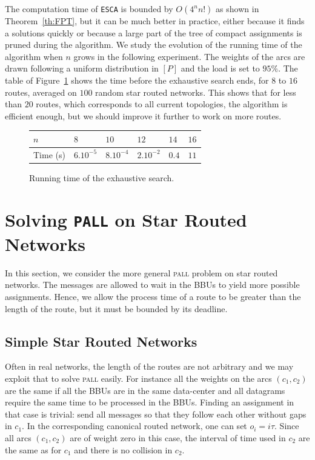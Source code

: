 \documentclass[a4paper,10pt]{article}
\newcommand\ESCA{\texttt{ESCA}\xspace}
\newcommand\pall{\textsc{pall}\xspace}
\begin{document}
       The computation time of \ESCA is bounded by $O(4^nn!)$ as shown in Theorem~\ref{th:FPT}, but it can be much better in practice, either because it finds a solutions quickly or because a large part of the tree of compact assignments is pruned during the algorithm. We study the evolution of the running time  of the algorithm when $n$ grows in the following experiment. The weights of the arcs are drawn following a uniform distribution in $[P]$ and the load is set to $95\%$.  The table of Figure~\ref{fig:table} shows the time before the exhaustive search ends, for $8$ to $16$ routes, averaged on $100$ random star routed networks. This shows that for less than $20$ routes, which corresponds to all current topologies, the algorithm is efficient enough, but we should improve it further to work on more routes.
       
             \begin{figure}[h]
         \begin{center}
         \begin{tabularx}{0.9\textwidth}{|l|X|X|X|X|X|}
    \hline
   $n$ & $8$ & $10$& $12$&$14$& $16$\\
    \hline
   Time (s) & $6.10^{-5}$&$8.10^{-4}$&$2.10^{-2}$& $0.4$& $11$\\
    \hline
      \end{tabularx}
      \end{center}
      \caption{Running time of the exhaustive search.}
      \label{fig:table}
      \end{figure}
      
         \section{Solving \texttt{PALL} on Star Routed Networks}\label{sec:PALL}
    
    In this section, we consider the more general \pall problem on star routed networks. The messages are allowed to wait in the BBUs to yield more possible assignments. Hence, we allow the process time of a route to be greater than the length of the route, but it must be bounded by its deadline.


	\subsection{Simple Star Routed Networks}
		

	Often in real networks, the length of the routes are not arbitrary and we may exploit that to solve \pall easily. For instance all the weights on the arcs $(c_1,c_2)$ are the same if all the BBUs are in the same data-center and all datagrams require the same time to be processed in the BBUs.
Finding an assignment in that case is trivial: send all messages so that they follow each other without gaps in $c_1$. In the corresponding canonical routed network, one can set $o_i = i\tau$.  Since all arcs $(c_1,c_2)$ are of weight zero in this case, the interval of time used in $c_2$ are the same as for $c_1$ and there is no collision in $c_2$.
\end{document}
